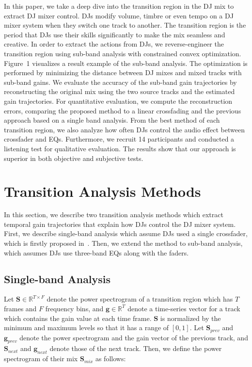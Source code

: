 \documentclass[sigconf]{nimeart}
\begin{document}
In this paper, we take a deep dive into the transition region in the DJ mix to extract DJ mixer control. DJs modify volume, timbre or even tempo on a DJ mixer system when they switch one track to another. The transition region is the period that DJs use their skills significantly to make the mix seamless and creative. In order to extract the actions from DJs, we reverse-engineer the transition region using sub-band analysis with constrained convex optimization. Figure~1 visualizes a result example of the sub-band analysis. The optimization is performed by minimizing the distance between DJ mixes and mixed tracks with sub-band gains. We evaluate the accuracy of the sub-band gain trajectories by reconstructing the original mix using the two source tracks and the estimated gain trajectories. For quantitative evaluation, we compute the reconstruction errors, comparing the proposed method to a linear crossfading and the previous approach based on a single band analysis. From the best method of each transition region, we also analyze how often DJs control the audio effect between crossfader and EQs. Furthermore, we recruit 14 participants and conducted a listening test for qualitative evaluation. The results show that our approach is superior in both objective and subjective tests.

\section{Transition Analysis Methods}\label{transition-analysis-methods}

In this section, we describe two transition analysis methods which extract temporal gain trajectories that explain how DJs control the DJ mixer system. First, we describe single-band analysis which assume DJs used a single crossfader, which is firstly proposed in~\cite{c17}. Then, we extend the method to sub-band analysis, which assumes DJs use three-band EQs along with the faders.

\subsection{Single-band Analysis}\label{single-band-analysis}

Let $\bm{S} \in \mathbb{R}^{T \times F}$ denote the power spectrogram of a transition region which has $T$ frames and $F$ frequency bins, and $\bm{g} \in \mathbb{R}^T$ denote a time-series vector for a track which contains the gain value at each time frame. $\bm{S}$ is normalized by the minimum and maximum levels so that it has a range of $[0, 1]$. Let $\bm{S}_{prev}$ and $\bm{g}_{prev}$ denote the power spectrogram and the gain vector of the previous track, and $\bm{S}_{next}$ and $\bm{g}_{next}$ denote those of the next track. Then, we define the power spectrogram of their mix $\bm{S}_{mix}$ as follows:
\end{document}
